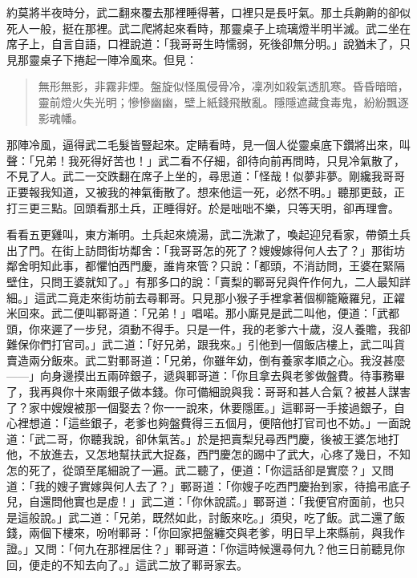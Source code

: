 約莫將半夜時分，武二翻來覆去那裡睡得著，口裡只是長吁氣。那土兵齁齁的卻似死人一般，挺在那裡。武二爬將起來看時，那靈桌子上琉璃燈半明半滅。武二坐在席子上，自言自語，口裡說道：「我哥哥生時懦弱，死後卻無分明。」說猶未了，只見那靈桌子下捲起一陣冷風來。但見：
\begin{quote}
無形無影，非霧非煙。盤旋似怪風侵骨冷，凜冽如殺氣透肌寒。昏昏暗暗，靈前燈火失光明；慘慘幽幽，壁上紙錢飛散亂。隱隱遮藏食毒鬼，紛紛飄逐影魂幡。
\end{quote}

那陣冷風，逼得武二毛髮皆豎起來。定睛看時，見一個人從靈桌底下鑽將出來，叫聲：「兄弟！我死得好苦也！」武二看不仔細，卻待向前再問時，只見冷氣散了，不見了人。武二一交跌翻在席子上坐的，尋思道：「怪哉！似夢非夢。剛纔我哥哥正要報我知道，又被我的神氣衝散了。想來他這一死，必然不明。」聽那更鼓，正打三更三點。回頭看那土兵，正睡得好。於是咄咄不樂，只等天明，卻再理會。

看看五更雞叫，東方漸明。土兵起來燒湯，武二洗漱了，喚起迎兒看家，帶領土兵出了門。在街上訪問街坊鄰舍：「我哥哥怎的死了？嫂嫂嫁得何人去了？」那街坊鄰舍明知此事，都懼怕西門慶，誰肯來管？只說：「都頭，不消訪問，王婆在緊隔壁住，只問王婆就知了。」有那多口的說：「賣梨的鄆哥兒與仵作何九，二人最知詳細。」這武二竟走來街坊前去尋鄆哥。只見那小猴子手裡拿著個柳籠簸羅兒，正糴米回來。武二便叫鄆哥道：「兄弟！」唱喏。那小廝見是武二叫他，便道：「武都頭，你來遲了一步兒，須動不得手。只是一件，我的老爹六十歲，沒人養贍，我卻難保你們打官司。」武二道：「好兄弟，跟我來。」引他到一個飯店樓上，武二叫貨賣造兩分飯來。武二對鄆哥道：「兄弟，你雖年幼，倒有養家孝順之心。我沒甚麼——」向身邊摸出五兩碎銀子，遞與鄆哥道：「你且拿去與老爹做盤費。待事務畢了，我再與你十來兩銀子做本錢。你可備細說與我：哥哥和甚人合氣？被甚人謀害了？家中嫂嫂被那一個娶去？你一一說來，休要隱匿。」這鄆哥一手接過銀子，自心裡想道：「這些銀子，老爹也夠盤費得三五個月，便陪他打官司也不妨。」一面說道：「武二哥，你聽我說，卻休氣苦。」於是把賣梨兒尋西門慶，後被王婆怎地打他，不放進去，又怎地幫扶武大捉姦，西門慶怎的踢中了武大，心疼了幾日，不知怎的死了，從頭至尾細說了一遍。武二聽了，便道：「你這話卻是實麼？」又問道：「我的嫂子實嫁與何人去了？」鄆哥道：「你嫂子吃西門慶抬到家，待搗弔底子兒，自還問他實也是虛！」武二道：「你休說謊。」鄆哥道：「我便官府面前，也只是這般說。」武二道：「兄弟，既然如此，討飯來吃。」須臾，吃了飯。武二還了飯錢，兩個下樓來，吩咐鄆哥：「你回家把盤纏交與老爹，明日早上來縣前，與我作證。」又問：「何九在那裡居住？」鄆哥道：「你這時候還尋何九？他三日前聽見你回，便走的不知去向了。」這武二放了鄆哥家去。

